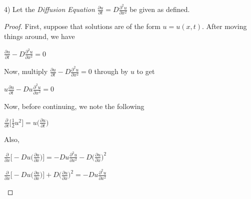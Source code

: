 \documentclass[12pt, executivepaper]{article}
\begin{document}
\vspace*{-40mm}

\begin{flushleft}

4) Let the \textit{Diffusion Equation} $\frac{\partial u}{\partial t}=D\frac{\partial^2 u}{\partial x^2}$ be given as defined. \\

\begin{proof}

First, suppose that solutions are of the form $u=u(x,t)$. After moving things around, we have

\begin{center}

$\frac{\partial u}{\partial t}-D\frac{\partial^2 u}{\partial x^2}=0$

\end{center} 

Now, multiply $\frac{\partial u}{\partial t}-D\frac{\partial^2 u}{\partial x^2}=0$ through by $u$ to get

\begin{center}

$u \frac{\partial u}{\partial t}-Du \frac{\partial^2 u}{\partial x^2}=0$

\end{center}

Now, before continuing, we note the following

\vspace{2mm}

\begin{center}

$\frac{\partial}{\partial t} \bigg[\frac{1}{2} u^2\bigg]=u \bigg(\frac{\partial u}{\partial t}\bigg)$

\end{center}

Also,

\begin{center}

$\frac{\partial}{\partial x} \bigg[-Du \bigg(\frac{\partial u}{\partial x}\bigg) \bigg]=-Du \frac{\partial^2 u}{\partial x^2} -D \bigg(\frac{\partial u}{\partial x}\bigg)^2$

\vspace{2mm}

$\frac{\partial}{\partial x} \bigg[-Du \bigg(\frac{\partial u}{\partial x}\bigg) \bigg]+D \bigg(\frac{\partial u}{\partial x}\bigg)^2=-Du \frac{\partial^2 u}{\partial x^2}$

\end{center}


\end{proof}
\end{flushleft}
\end{document}
